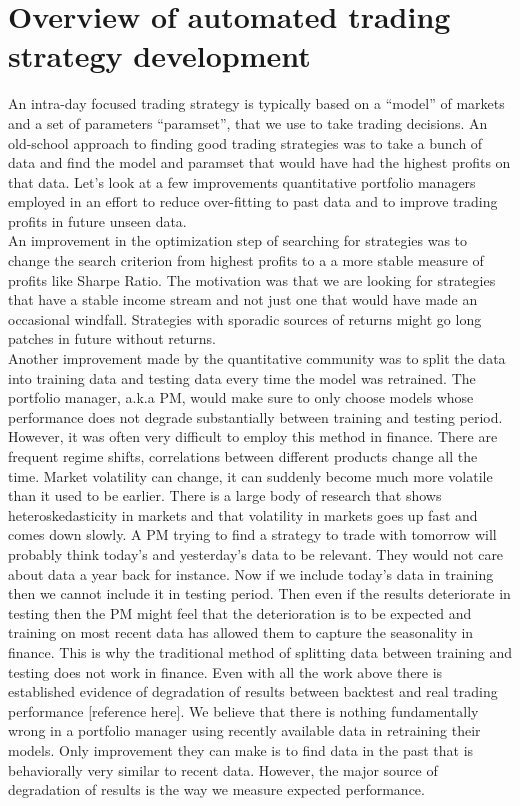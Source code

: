 \documentclass[a4paper]{article}
\begin{document}
\section{Overview of automated trading strategy development\label{overview}}
An intra-day focused trading strategy is typically based on a ``model'' of markets and a set of parameters ``paramset'', that we use to take trading decisions. An old-school approach to finding good trading strategies was to take a bunch of data and find the model and paramset that would have had the highest profits on that data. Let's look at a few improvements quantitative portfolio managers employed in an effort to reduce over-fitting to past data and to improve trading profits in future unseen data.\\
An improvement in the optimization step of searching for strategies was to change the search criterion from highest profits to a a more stable measure of profits like Sharpe Ratio. The motivation was that we are looking for strategies that have a stable income stream and not just one that would have made an occasional windfall. Strategies with sporadic sources of returns might go long patches in future without returns.\\
Another improvement made by the quantitative community was to split the data into training data and testing data every time the model was retrained. The portfolio manager, a.k.a PM, would make sure to only choose models whose performance does not degrade substantially between training and testing period. However, it was often very difficult to employ this method in finance. There are frequent regime shifts, correlations between different products change all the time. Market volatility can change, it can suddenly become much more volatile than it used to be earlier. There is a large body of research that shows heteroskedasticity in markets and that volatility in markets goes up fast and comes down slowly. A PM trying to find a strategy to trade with tomorrow will probably think today's and yesterday's data to be relevant. They would not care about data a year back for instance. Now if we include today's data in training then we cannot include it in testing period. Then even if the results deteriorate in testing then the PM might feel that the deterioration is to be expected and training on most recent data has allowed them to capture the seasonality in finance. This is why the traditional method of splitting data between training and testing does not work in finance.
Even with all the work above there is established evidence of degradation of results between backtest and real trading performance [reference here]. We believe that there is nothing fundamentally wrong in a portfolio manager using recently available data in retraining their models. Only improvement they can make is to find data in the past that is behaviorally very similar to recent data. However, the major source of degradation of results is the way we measure expected performance.\\
\end{document}
